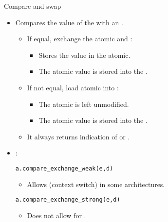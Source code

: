 \begin{frame}[t,fragile]{Compare and swap}
\begin{itemize}
  \item Compares the value of the  with an 
        .
    \begin{itemize}
      \item If equal, exchange the atomic and :
         \begin{itemize}
           \item Stores the  value in the atomic.
           \item The atomic value is stored into the .
         \end{itemize}
      \item If not equal, load atomic into :
        \begin{itemize}
          \item The atomic is left unmodified.
           \item The atomic value is stored into the .
        \end{itemize}
      \item It always returns indication of  or .
    \end{itemize}

  \item {}:

\begin{lstlisting}
a.compare_exchange_weak(e,d)
\end{lstlisting}
    \begin{itemize}
      \item Allows  (context switch) in some architectures.
    \end{itemize}

\begin{lstlisting}
a.compare_exchange_strong(e,d)
\end{lstlisting}
    \begin{itemize}
      \item Does not allow for .
    \end{itemize}
\end{itemize}
\end{frame}

